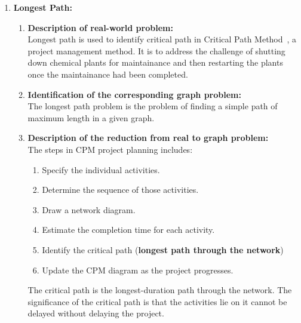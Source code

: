 \documentclass[article, 10pt,onecolumn]{article}
\begin{document}
\begin{enumerate}
\item \textbf{Longest Path:} 
 \begin{enumerate}
   \item \textbf{Description of real-world problem:}\\
    Longest path is used to identify critical path in Critical Path Method~\cite{cpm}, a project
    management method. It is to address the challenge of shutting down chemical plants for maintainance and then restarting the plants once
    the maintainance had been completed. 
   \item \textbf{Identification of the corresponding graph problem:}\\
    The longest path problem is the problem of finding a simple path of maximum length in a given graph.
   \item \textbf{Description of the reduction from real to graph problem:}\\
    The steps in CPM project planning includes: 
    \begin{enumerate}
	    \item Specify the individual activities.
	    \item Determine the sequence of those activities.
	    \item Draw a network diagram.
	    \item Estimate the completion time for each activity.
	    \item Identify the critical path (\textbf{longest path through the network})
	    \item Update the CPM diagram as the project progresses.
    \end{enumerate}
    The critical path is the longest-duration path through the network. The significance of the critical path is that the activities lie on
    it cannot be delayed without delaying the project.
 \end{enumerate}
\end{enumerate}


\end{document}

